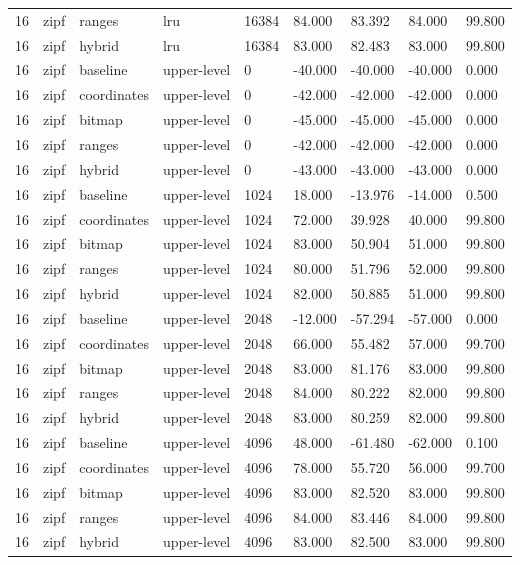 \begin{tabular}{lllllllll}
16 & zipf & ranges & lru & 16384 & 84.000 & 83.392 & 84.000 & 99.800 \\
16 & zipf & hybrid & lru & 16384 & 83.000 & 82.483 & 83.000 & 99.800 \\
16 & zipf & baseline & upper-level & 0 & -40.000 & -40.000 & -40.000 & 0.000 \\
16 & zipf & coordinates & upper-level & 0 & -42.000 & -42.000 & -42.000 & 0.000 \\
16 & zipf & bitmap & upper-level & 0 & -45.000 & -45.000 & -45.000 & 0.000 \\
16 & zipf & ranges & upper-level & 0 & -42.000 & -42.000 & -42.000 & 0.000 \\
16 & zipf & hybrid & upper-level & 0 & -43.000 & -43.000 & -43.000 & 0.000 \\
16 & zipf & baseline & upper-level & 1024 & 18.000 & -13.976 & -14.000 & 0.500 \\
16 & zipf & coordinates & upper-level & 1024 & 72.000 & 39.928 & 40.000 & 99.800 \\
16 & zipf & bitmap & upper-level & 1024 & 83.000 & 50.904 & 51.000 & 99.800 \\
16 & zipf & ranges & upper-level & 1024 & 80.000 & 51.796 & 52.000 & 99.800 \\
16 & zipf & hybrid & upper-level & 1024 & 82.000 & 50.885 & 51.000 & 99.800 \\
16 & zipf & baseline & upper-level & 2048 & -12.000 & -57.294 & -57.000 & 0.000 \\
16 & zipf & coordinates & upper-level & 2048 & 66.000 & 55.482 & 57.000 & 99.700 \\
16 & zipf & bitmap & upper-level & 2048 & 83.000 & 81.176 & 83.000 & 99.800 \\
16 & zipf & ranges & upper-level & 2048 & 84.000 & 80.222 & 82.000 & 99.800 \\
16 & zipf & hybrid & upper-level & 2048 & 83.000 & 80.259 & 82.000 & 99.800 \\
16 & zipf & baseline & upper-level & 4096 & 48.000 & -61.480 & -62.000 & 0.100 \\
16 & zipf & coordinates & upper-level & 4096 & 78.000 & 55.720 & 56.000 & 99.700 \\
16 & zipf & bitmap & upper-level & 4096 & 83.000 & 82.520 & 83.000 & 99.800 \\
16 & zipf & ranges & upper-level & 4096 & 84.000 & 83.446 & 84.000 & 99.800 \\
16 & zipf & hybrid & upper-level & 4096 & 83.000 & 82.500 & 83.000 & 99.800 \\

\end{tabular}
